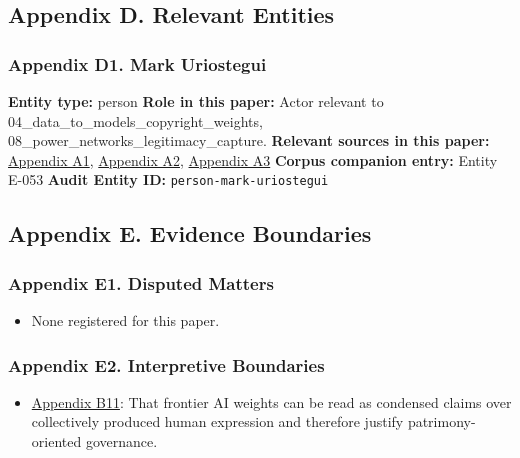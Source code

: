 \documentclass[
  american,
  11pt,
  letterpaper,
]{article}
\providecommand{\tightlist}{%
  \setlength{\itemsep}{0pt}\setlength{\parskip}{0pt}}
\begin{document}
\subsection{Appendix D. Relevant
Entities}\label{appendix-d.-relevant-entities}

\subsubsection{Appendix D1. Mark
Uriostegui}\label{appendix-d1-mark-uriostegui}

\textbf{Entity type:} person \textbf{Role in this paper:} Actor relevant
to 04\_data\_to\_models\_copyright\_weights,
08\_power\_networks\_legitimacy\_capture. \textbf{Relevant sources in
this paper:}
\hyperref[appendix-a1-ai-copyright-weights-a-new-frontier-in-intellectual-property-law]{Appendix
A1},
\hyperref[appendix-a2-how-ai-is-ruining-your-life-to-build-an-empire]{Appendix
A2},
\hyperref[appendix-a3-bipartisan-house-task-force-report-on-artificial-intelligence]{Appendix
A3} \textbf{Corpus companion entry:} Entity E-053 \textbf{Audit Entity
ID:} \texttt{person-mark-uriostegui}

\subsection{Appendix E. Evidence
Boundaries}\label{appendix-e.-evidence-boundaries}

\subsubsection{Appendix E1. Disputed
Matters}\label{appendix-e1-disputed-matters}

\begin{itemize}
\tightlist
\item
  None registered for this paper.
\end{itemize}

\subsubsection{Appendix E2. Interpretive
Boundaries}\label{appendix-e2-interpretive-boundaries}

\begin{itemize}
\tightlist
\item
  \hyperref[appendix-b11-frontier-ai-weights-can-be-read-as-condensed-claims-over-collectively-produced-hu]{Appendix
  B11}: That frontier AI weights can be read as condensed claims over
  collectively produced human expression and therefore justify
  patrimony-oriented governance.
\end{itemize}
\end{document}
